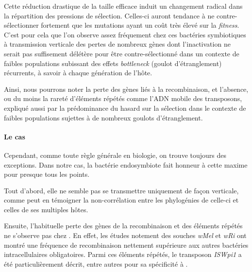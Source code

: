 Cette réduction drastique de la taille efficace induit un changement radical dans la répartition des pressions de sélection. Celles-ci auront tendance à ne contre-sélectionner fortement que les mutations ayant un coût très élevé sur la \textit{fitness}.
C'est pour cela que l'on observe assez fréquement chez ces bactéries symbiotiques à transmission verticale des pertes de nombreux gènes\cite{wernegreen2002} dont  l'inactivation ne serait pas suffisement délétère pour être contre-sélectionné dans un contexte de faibles populations subissant des effets \textit{bottleneck} (goulot d’étranglement) récurrents, à savoir à chaque génération de l'hôte.


Ainsi, nous pourrons noter la perte des gènes liés à la recombinaison, et l'absence, ou du moins la rareté\cite{Bordenstein2005} d'éléments répétés comme l'ADN mobile des transposons, expliqué aussi par la prédominance du hasard sur la sélection dans le contexte de faibles populations sujettes à de nombreux goulots d’étranglement.

\paragraph{Le cas \\}
Cependant, comme toute règle générale en biologie, on trouve toujours des exceptions. Dans notre cas, la bactérie endosymbiote  fait honneur à cette maxime pour presque tous les points. 

Tout d'abord, elle ne semble pas se transmettre uniquement de façon verticale, comme peut en témoigner la non-corrélation entre les phylogénies de celle-ci et celles de ses multiples hôtes\cite{vavre1999}.

Ensuite, l’habituelle perte des gènes de la recombinaison et des éléments répétés ne s’observe pas chez . En effet, les études notement des souches \textit{wMel} et \textit{wRi} ont montré une fréquence de recombinaison nettement supérieure aux autres bactéries intracellulaires obligatoires\cite{Wu2004}.
Parmi ces éléments répétés, le transposon \textit{ISWpi1} a été particulièrement décrit\cite{Cordaux2008}, entre autres pour sa spécificité à .%

